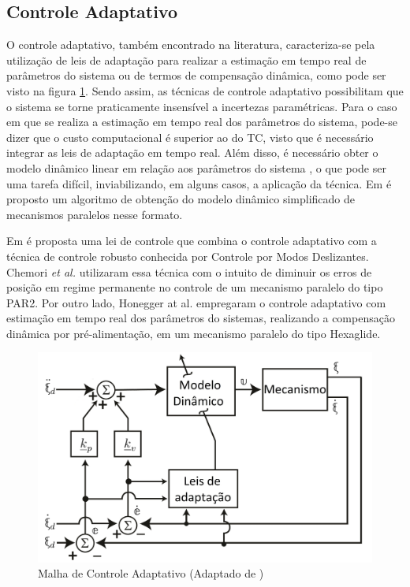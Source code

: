 \documentclass[]{politex}
\begin{document}
\subsection{Controle Adaptativo}

O controle adaptativo, também encontrado na literatura, caracteriza-se pela utilização de leis de adaptação para realizar a estimação em tempo real de parâmetros do sistema ou de termos de compensação dinâmica, como pode ser visto na figura \ref{fig:CA}. Sendo assim, as técnicas de controle adaptativo possibilitam que o sistema se torne praticamente insensível a incertezas paramétricas. Para o caso em que se realiza a estimação em tempo real dos parâmetros do sistema, pode-se dizer que o custo computacional é superior ao do TC, visto que é necessário integrar as leis de adaptação em tempo real. Além disso, é necessário obter o modelo dinâmico linear em relação aos parâmetros do sistema \cite{SlotiniA}, o que pode ser uma tarefa difícil, inviabilizando, em alguns casos, a aplicação da técnica. Em \cite{CodoureyBurdet} é proposto um algoritmo de obtenção do modelo dinâmico simplificado de mecanismos paralelos nesse formato.

Em \cite{SlotiniA} é proposta uma lei de controle que combina o controle adaptativo com a técnica de controle robusto conhecida por Controle por Modos Deslizantes. Chemori \emph{et al.} \cite{Chemori} utilizaram essa técnica  com o intuito de diminuir os erros de posição em regime permanente no controle de um mecanismo paralelo do tipo PAR2. Por outro lado, Honegger at al. \cite{Honegger} empregaram o controle adaptativo com estimação em tempo real dos parâmetros do sistemas, realizando a compensação dinâmica por pré-alimentação, em um mecanismo  paralelo do tipo Hexaglide.

\begin{figure}[h]
	\centering
	\includegraphics[scale=0.47]{../figures/CAnew.jpg}  
	\caption{Malha de Controle Adaptativo (Adaptado de \cite{Craig})}
	\label{fig:CA}
\end{figure}
\end{document}
